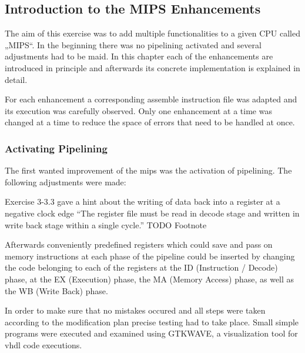


\subsection{Introduction to the MIPS Enhancements}
\label{sec:introductionToEnhancements}

The aim of this exercise was to add multiple functionalities to a given CPU called „MIPS“. In the beginning there was no pipelining activated and several adjustments had to be maid. In this chapter each of the enhancements are introduced in principle and afterwards its concrete implementation is explained in detail.

For each enhancement a corresponding assemble instruction file was adapted and its execution was carefully observed. Only one enhancement at a time was changed at a time to reduce the space of errors that need to be handled at once.


\subsubsection{Activating Pipelining}
\label{sec:activatingPipelining}
The first wanted improvement of the mips was the activation of pipelining. The following adjustments were made:

Exercise 3-3.3 gave a hint about the writing of data back into a register at a negative clock edge ``The register file must be read in decode stage and written in write back stage within a single cycle.'' TODO Footnote



Afterwards conveniently predefined registers which could save and pass on memory instructions at each phase of the pipeline could be inserted by changing the code belonging to each of the registers at the ID (Instruction / Decode) phase, at the EX (Execution) phase, the MA (Memory Access) phase, as well as the WB (Write Back) phase.



In order to make sure that no mistakes occured and all steps were taken according to the modification plan precise testing had to take place. Small simple programs were executed and examined using GTKWAVE, a visualization tool for vhdl code executions. 

